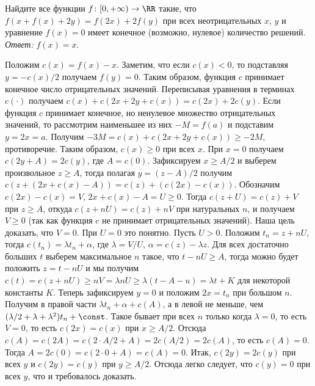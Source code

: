 \problem{}
Найдите все функции $f \colon [0, +\infty) \to \RR$ такие, что
$f(x + f(x) + 2 y) = f(2 x) + 2 f(y)$
при всех неотрицательных $x$, $y$ и уравнение $f(x) = 0$ имеет конечное
(возможно, нулевое) количество решений.
\solution
\emph{Ответ:} $f(x) = x$.
\par
Положим $c(x) = f(x) - x$.
Заметим, что если $c(x) < 0$, то подставляя $y = -c(x) / 2$ получаем
$f(y) = 0$.
Таким образом, функция $c$ принимает конечное число отрицательных значений.
Переписывая уравнения в терминах $c(\cdot)$ получаем
$c(x) + c(2 x + 2 y + c(x)) = c(2 x) + 2 c(y)$.
Если функция $c$ принимает конечное, но ненулевое множество отрицательных
значений, то рассмотрим наименьшее из них $-M = f(a)$ и подставим
$y = 2 x = a$.
Получим $- 3 M = c(x) + c(2 x + 2 y + c(x)) \geq -2 M$, противоречие.
Таким образом, $c(x) \geq 0$ при всех $x$.
При $x = 0$ получаем $c(2 y + A) = 2 c(y)$, где $A = c(0)$.
Зафиксируем $x \geq A / 2$ и выберем произвольное $z \geq A$, тогда полагая
$y = (z - A) / 2$ получим $c(z + (2 x + c(x) - A)) = c(z) + (c(2 x) - c(x))$.
Обозначим $c(2 x) - c(x) = V$, $2 x + c(x) - A = U \geq 0$.
Тогда $c(z + U) = c(z) + V$ при $z \geq A$, откуда $c(z + n U) = c(z) + n V$
при натуральных $n$, и получаем $V \geq 0$
(так как функция $c$ не принимает отрицательных значений).
Наша цель доказать, что $V = 0$.
При $U = 0$ это понятно.
Пусть $U > 0$.
Положим $t_n = z + n U$, тогда $c(t_n) = \lambda t_n + \alpha$, где
$\lambda = V / U$, $\alpha = c(z) - \lambda z$.
Для всех достаточно больших $t$ выберем максимальное $n$ такое, что
$t - n U \geq A$, тогда можно будет положить $z = t - n U$ и мы получим
\(
    c(t)
=
    c(z + n U)
\geq
    n V
=
    \lambda n U
\geq
    \lambda (t - A - u)
=
    \lambda t + K
\)
для некоторой константы $K$.
Теперь зафиксируем $y = 0$ и положим $2 x = t_n$ при большом $n$.
Получим в правой части $\lambda t_n + \alpha + c(A)$, а в левой не меньше, чем
$(\lambda / 2 + \lambda + \lambda^2) t_n + \const$.
Такое бывает при всех $n$ только когда $\lambda = 0$, то есть $V = 0$, то есть
$c(2 x) = c(x)$ при $x \geq A / 2$.
Отсюда
$c(A) = c(2 A) = c(2 \cdot A / 2 + A) = 2 c(A / 2) = 2 c(A)$,
то есть $c(A) = 0$.
Тогда $A = 2 c(0) = c(2 \cdot 0 + A) = c(A) = 0$.
Итак, $c(2 y) = 2 c(y)$ при всех $y$ и $c(2 y) = c(y)$ при $y \geq A / 2$.
Отсюда легко следует, что $c(y) = 0$ при всех $y$, что и требовалось доказать.
\endproblem
